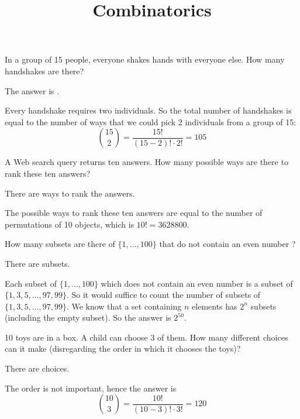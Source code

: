 \documentclass{ximera}
\title{Combinatorics}
\begin{document}
\maketitle



\begin{question}
In a group of 15 people, everyone shakes hands with everyone else.
How many handshakes are there?
\begin{solution}
The answer is .
\end{solution}
Every handshake requires two individuals. So the total number of
handshakes is equal to the number of ways that we could pick 2
individuals from a group of 15:
\[
\binom{15}{2} = \frac{15!}{(15 - 2)! \cdot 2!} = 105
\]
\end{question}

\begin{question}
A Web search query returns ten answers. How many possible ways are
there to rank these ten answers?
\begin{solution}
There are  ways to rank the answers.
\end{solution}
The possible ways to rank these ten answers are equal to the number of
permutations of 10 objects, which is $10! = 3628800$.
\end{question}

\begin{question}
How many subsets are there of $\{1, ... , 100\}$ that do not contain
an even number ?
\begin{solution}
There are  subsets.
\end{solution}
Each subset of $\{1 , \ldots , 100\}$ which does not contain an even
number is a subset of $\{1, 3, 5, \ldots , 97, 99\}$. So it would
suffice to count the number of subsets of $\{1, 3, 5, \ldots , 97,
99\}$. We know that a set containing $n$ elements has $2^n$ subsets
(including the empty subset). So the answer is $2^{50}$.
\end{question}

\begin{question}
10 toys are in a box.  A child can choose 3 of them.  How many
different choices can it make (disregarding the order in which it
chooses the toys)?
\begin{solution}
There are  choices.
\end{solution}
The order is not important, hence the answer is
\[
\binom{10}{3} = \frac{10!}{(10-3)! \cdot 3!} = 120
\]
\end{question}
\end{document}
